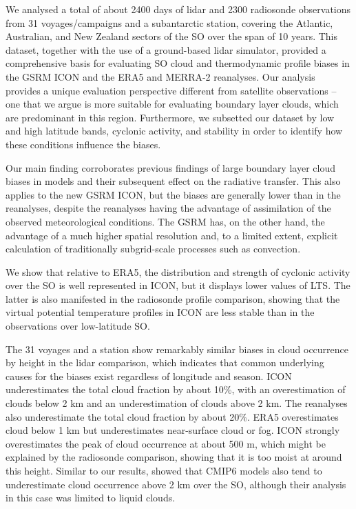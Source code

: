 \documentclass[12pt,a4paper]{article}
\begin{document}
We analysed a total of about 2400 days of lidar and 2300 radiosonde
observations from 31 voyages/campaigns and a subantarctic station, covering the
Atlantic, Australian, and New Zealand sectors of the SO over the span of 10
years. This dataset, together with the use of a ground-based lidar simulator,
provided a comprehensive basis for evaluating SO cloud and thermodynamic
profile biases in the GSRM ICON and the ERA5 and MERRA-2 reanalyses. Our
analysis provides a unique evaluation perspective different from satellite
observations -- one that we argue is more suitable for evaluating boundary layer clouds,
which are predominant in this region. Furthermore, we subsetted our dataset by
low and high latitude bands, cyclonic activity, and stability in order to
identify how these conditions influence the biases.

Our main finding corroborates previous findings of large boundary layer cloud
biases in models and their subsequent effect on the radiative transfer. This
also applies to the new GSRM ICON, but the biases are generally lower than in the
reanalyses, despite the reanalyses having the advantage of assimilation of the
observed meteorological conditions.  The GSRM has, on the other hand, the
advantage of a much higher spatial resolution and, to a limited extent,
explicit calculation of traditionally subgrid-scale processes such as
convection.

We show that relative to ERA5, the distribution and strength of cyclonic
activity over the SO is well represented in ICON, but it displays lower values of LTS. The latter is also manifested in the radiosonde profile
comparison, showing that the virtual potential temperature profiles in ICON
are less stable than in the observations over low-latitude SO.

The 31 voyages and a station show remarkably similar biases in cloud occurrence by
height in the lidar comparison, which indicates that common underlying causes
for the biases exist regardless of longitude and season. ICON underestimates
the total cloud fraction by about 10\%, with an overestimation of clouds below
2 km and an underestimation of clouds above 2 km. The reanalyses also
underestimate the total cloud fraction by about 20\%.  ERA5 overestimates cloud
below 1 km but underestimates near-surface cloud or fog. ICON strongly
overestimates the peak of cloud occurrence at about 500 m, which might be
explained by the radiosonde comparison, showing that it is too moist at
around this height.  Similar to our results, \cite{cesana2022} showed that
CMIP6 models also tend to underestimate cloud occurrence above 2 km over the
SO, although their analysis in this case was limited to liquid clouds.
\end{document}
